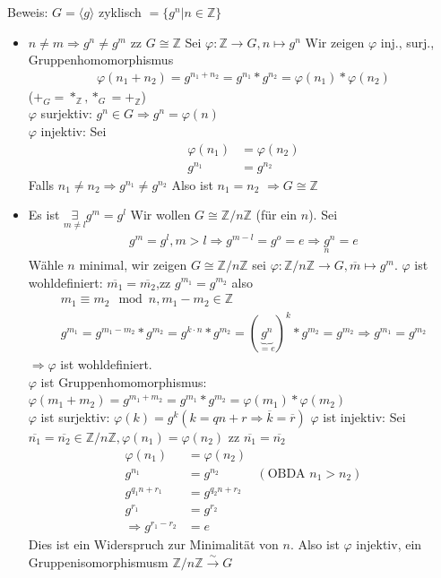\documentclass{article}
\newcommand{\Z}{\mathbb{Z}}
\begin{document}
Beweis:
$G=\langle g\rangle$ zyklisch $=\{g^n|n\in\Z\}$
\begin{itemize}
    \item $n\neq m\Rightarrow g^n\neq g^m$
        zz $G\cong\Z$ Sei $\varphi:\Z\to G,n\mapsto g^n$
        Wir zeigen $\varphi$ inj., surj.,
        Gruppenhomomorphismus
        \begin{align*}
            \varphi(n_1+n_2)=g^{n_1+n_2}
            =g^{n_1}*g^{n_2}=\varphi(n_1)*\varphi(n_2)
        \end{align*}
        ($+_G=*_\Z,*_G=+_\Z$)\\
        $\varphi$ surjektiv: $g^n\in G\Rightarrow
        g^n=\varphi(n)$\\
        $\varphi$ injektiv: Sei
        \begin{align*}
            \varphi(n_1)&=\varphi(n_2)\\
            g^{n_1}&=g^{n_2}
        \end{align*}
        Falls $n_1\neq n_2\Rightarrow g^{n_1}\neq g^{n_2}$
        Also ist $n_1=n_2$
        $\Rightarrow G\cong\Z$
    \item
        Es ist $\underset{m\neq l}\exists g^m=g^l$
        Wir wollen $G\cong\Z/n\Z$ (für ein $n$). Sei
        \begin{align*}
            g^m=g^l,m>l\Rightarrow g^{m-l}=g^o=e
            \Rightarrow\underset{n}g^n=e
        \end{align*}
        Wähle $n$ minimal, wir zeigen $G\cong\Z/n\Z$
        sei $\varphi:\Z/n\Z\to G,\overline{m}\mapsto g^m$.
        $\varphi$ ist wohldefiniert: $\overline{m_1}=
        \overline{m_2}$,zz $g^{m_1}=g^{m_2}$
        also
        \begin{align*}
            m_1\equiv m_2\mod n,m_1-m_2\in\Z\\
            g^{m_1}=g^{m_1-m_2}*g^{m_2}
            =g^{k\cdot n}*g^{m_2}
            =\left(
            \underbrace{g^n}_{=e}
            \right)^k*g^{m_2}=g^{m_2}
            \Rightarrow g^{m_1}=g^{m_2}
        \end{align*}
        $\Rightarrow\varphi$ ist wohldefiniert.\\
        $\varphi$ ist Gruppenhomomorphismus:
        $\varphi(m_1+m_2)=g^{m_1+m_2}=g^{m_1}*g^{m_2}=
        \varphi(m_1)*\varphi(m_2)$\\
        $\varphi$ ist surjektiv: $\varphi(k)=g^k
        (k=qn+r\Rightarrow\overline{k}=\overline{r})$
        $\varphi$ ist injektiv: Sei $\overline{n_1}=
        \overline{n_2}\in\Z/n\Z,\varphi(n_1)=\varphi(n_2)$
        zz $\overline{n_1}=\overline{n_2}$
        \begin{align*}
            \varphi(n_1)&=\varphi(n_2)\\
            g^{n_1}&=g^{n_2}&(\text{OBDA }n_1>n_2)\\
            g^{q_1n+r_1}&=g^{q_2n+r_2}\\
            g^{r_1}&=g^{r_2}\\
            \Rightarrow g^{r_1-r_2}&=e
        \end{align*}
        Dies ist ein Widerspruch zur Minimalität von $n$.
        Also ist $\varphi$ injektiv, ein
        Gruppenisomorphismusm $\Z/n\Z\overset{\sim}\to G$
\end{itemize}
\end{document}

